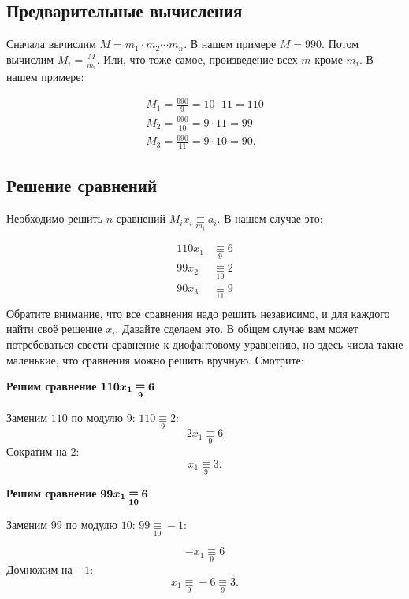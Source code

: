 \documentclass{article}
\newcommand{\eqmod}[1]{\mathbin{\underset{#1}\equiv}}
\begin{document}
\subsection{Предварительные вычисления}

Сначала вычислим $M = m_1\cdot m_2\cdots m_n$. В нашем примере $M = 990$.
Потом вычислим $M_i = \frac{M}{m_i}$. Или, что тоже самое, произведение всех
$m$ кроме $m_i$. В нашем примере:

\begin{gather*}
M_1 = \frac{990}{9} = 10\cdot11 = 110 \\
M_2 = \frac{990}{10} = 9\cdot11 = 99 \\
M_3 = \frac{990}{11} = 9\cdot10 = 90.
\end{gather*}

\subsection{Решение сравнений}

Необходимо решить $n$ сравнений $M_i x_i \eqmod{m_i} a_i$. В нашем случае это:

\[
\begin{aligned}
110x_1 & \eqmod{9} 6 \\
99x_2 & \eqmod{10} 2 \\
90x_3 & \eqmod{11} 9 \\
\end{aligned}
\]
Обратите внимание, что все сравнения надо решить независимо, и для каждого найти своё решение
$x_i$. Давайте сделаем это. В общем случае вам может потребоваться свести сравнение к диофантовому
уравнению, но здесь числа такие маленькие, что сравнения можно решить вручную. Смотрите:

\noindent\textbf{Решим сравнение} $\boldmath 110x_1 \eqmod{9} 6$

Заменим $110$ по модулю $9$: $110\eqmod9 2$:
\[
2x_1 \eqmod{9} 6
\]
Сократим на 2:
\[
x_1 \eqmod{9} 3.
\]

\noindent\textbf{Решим сравнение} $\boldmath 99x_1 \eqmod{10} 6$


Заменим $99$ по модулю $10$: $99\eqmod{10} -1$:

\[
-x_1 \eqmod{9} 6
\]
Домножим на $-1$:
\[
x_1 \eqmod{9} -6 \eqmod{9} 3.
\]
\end{document}
